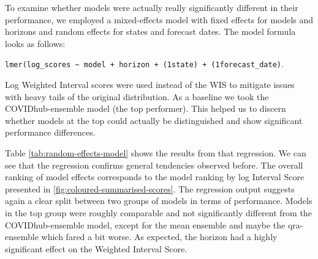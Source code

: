 \documentclass[
]{book}
\begin{document}
To examine whether models were actually really significantly different in their performance, we employed a mixed-effects model with fixed effects for models and horizons and random effects for states and forecast dates. The model formula looks as follows:

\texttt{lmer(log\_scores\ \textasciitilde{}\ model\ +\ horizon\ +\ (1\textbar{}state)\ +\ (1\textbar{}forecast\_date)}.

Log Weighted Interval scores were used instead of the WIS to mitigate issues with heavy tails of the original distribution. As a baseline we took the COVIDhub-ensemble model (the top performer). This helped us to discern whether models at the top could actually be distinguished and show significant performance differences.

Table \ref{tab:random-effects-model} shows the results from that regression. We can see that the regression confirms general tendencies observed before. The overall ranking of model effects corresponds to the model ranking by log Interval Score presented in \ref{fig:coloured-summarised-scores}. The regression output suggests again a clear split between two groups of models in terms of performance. Models in the top group were roughly comparable and not significantly different from the COVIDhub-ensemble model, except for the mean ensemble and maybe the qra-ensemble which fared a bit worse. As expected, the horizon had a highly significant effect on the Weighted Interval Score.
\end{document}
